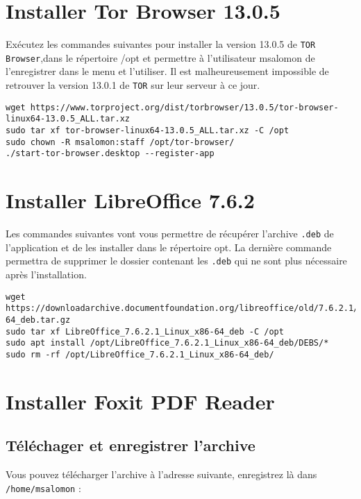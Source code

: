 \section{Installer Tor Browser 13.0.5}

Exécutez les commandes suivantes pour installer la version 13.0.5 de \texttt{TOR Browser},dans le répertoire /opt et permettre à l'utilisateur msalomon de l'enregistrer dans le menu et l'utiliser. Il est malheureusement impossible de retrouver la version 13.0.1 de \texttt{TOR} sur leur serveur à ce jour.

\begin{lstlisting}
wget https://www.torproject.org/dist/torbrowser/13.0.5/tor-browser-linux64-13.0.5_ALL.tar.xz
sudo tar xf tor-browser-linux64-13.0.5_ALL.tar.xz -C /opt
sudo chown -R msalomon:staff /opt/tor-browser/
./start-tor-browser.desktop --register-app
\end{lstlisting}

\section{Installer LibreOffice 7.6.2}

Les commandes suivantes vont vous permettre de récupérer l'archive \texttt{.deb} de l'application et de les installer dans le répertoire opt. La dernière commande permettra de supprimer le dossier contenant les \texttt{.deb} qui ne sont plus nécessaire après l'installation.

\begin{lstlisting}
wget https://downloadarchive.documentfoundation.org/libreoffice/old/7.6.2.1/deb/x86_64/LibreOffice_7.6.2.1_Linux_x86-64_deb.tar.gz
sudo tar xf LibreOffice_7.6.2.1_Linux_x86-64_deb -C /opt
sudo apt install /opt/LibreOffice_7.6.2.1_Linux_x86-64_deb/DEBS/*
sudo rm -rf /opt/LibreOffice_7.6.2.1_Linux_x86-64_deb/
\end{lstlisting}

\section{Installer Foxit PDF Reader}

\subsection{Téléchager et enregistrer l'archive}

Vous pouvez télécharger l'archive à l'adresse suivante, enregistrez là dans \texttt{/home/msalomon} :

